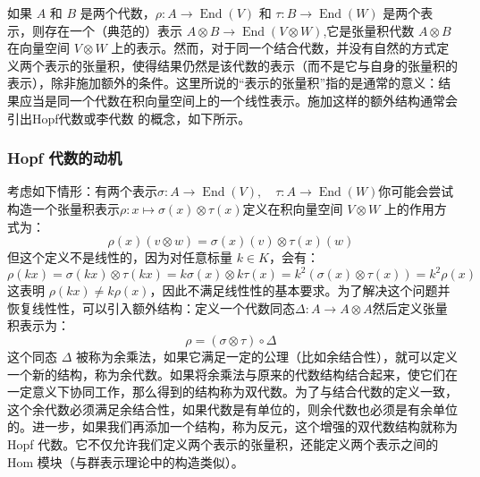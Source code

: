 如果 $A$ 和 $B$ 是两个代数，$\rho : A \to \operatorname{End}(V)$ 和 $\tau : B \to \operatorname{End}(W)$ 是两个表示，则存在一个（典范的）表示
$A \otimes B \to \operatorname{End}(V \otimes W)$,它是张量积代数 $A \otimes B$ 在向量空间 $V \otimes W$ 上的表示。然而，对于同一个结合代数，并没有自然的方式定义两个表示的张量积，使得结果仍然是该代数的表示（而不是它与自身的张量积的表示），除非施加额外的条件。这里所说的“表示的张量积”指的是通常的意义：结果应当是同一个代数在积向量空间上的一个线性表示。施加这样的额外结构通常会引出Hopf代数或李代数 的概念，如下所示。
\subsubsection{Hopf 代数的动机}
考虑如下情形：有两个表示$\sigma : A \to \operatorname{End}(V), \quad \tau : A \to \operatorname{End}(W)$你可能会尝试构造一个张量积表示$\rho : x \mapsto \sigma(x) \otimes \tau(x)$定义在积向量空间 $V \otimes W$ 上的作用方式为：
$$
\rho(x)(v \otimes w) = \sigma(x)(v) \otimes \tau(x)(w)~
$$
但这个定义不是线性的，因为对任意标量 $k \in K$，会有：
$$
\rho(kx) = \sigma(kx) \otimes \tau(kx) = k \sigma(x) \otimes k \tau(x) = k^2 (\sigma(x) \otimes \tau(x)) = k^2 \rho(x)~
$$
这表明 $\rho(kx) \ne k \rho(x)$，因此不满足线性性的基本要求。为了解决这个问题并恢复线性性，可以引入额外结构：定义一个代数同态$\Delta: A \to A \otimes A$然后定义张量积表示为：
$$
\rho = (\sigma \otimes \tau) \circ \Delta~
$$
这个同态 $\Delta$ 被称为余乘法，如果它满足一定的公理（比如余结合性），就可以定义一个新的结构，称为余代数。如果将余乘法与原来的代数结构结合起来，使它们在一定意义下协同工作，那么得到的结构称为双代数。为了与结合代数的定义一致，这个余代数必须满足余结合性，如果代数是有单位的，则余代数也必须是有余单位的。进一步，如果我们再添加一个结构，称为反元，这个增强的双代数结构就称为Hopf 代数。它不仅允许我们定义两个表示的张量积，还能定义两个表示之间的 Hom 模块（与群表示理论中的构造类似）。
